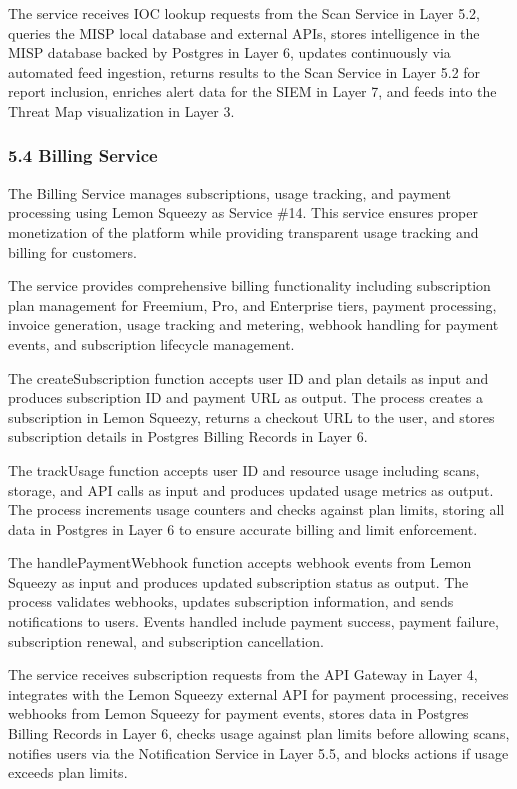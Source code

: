 \documentclass[12pt,a4paper]{report}
\begin{document}
The service receives IOC lookup requests from the Scan Service in Layer 5.2, queries the MISP local database and external APIs, stores intelligence in the MISP database backed by Postgres in Layer 6, updates continuously via automated feed ingestion, returns results to the Scan Service in Layer 5.2 for report inclusion, enriches alert data for the SIEM in Layer 7, and feeds into the Threat Map visualization in Layer 3.

\subsubsection{5.4 Billing Service}

The Billing Service manages subscriptions, usage tracking, and payment processing using Lemon Squeezy as Service \#14. This service ensures proper monetization of the platform while providing transparent usage tracking and billing for customers.

The service provides comprehensive billing functionality including subscription plan management for Freemium, Pro, and Enterprise tiers, payment processing, invoice generation, usage tracking and metering, webhook handling for payment events, and subscription lifecycle management.

The createSubscription function accepts user ID and plan details as input and produces subscription ID and payment URL as output. The process creates a subscription in Lemon Squeezy, returns a checkout URL to the user, and stores subscription details in Postgres Billing Records in Layer 6.

The trackUsage function accepts user ID and resource usage including scans, storage, and API calls as input and produces updated usage metrics as output. The process increments usage counters and checks against plan limits, storing all data in Postgres in Layer 6 to ensure accurate billing and limit enforcement.

The handlePaymentWebhook function accepts webhook events from Lemon Squeezy as input and produces updated subscription status as output. The process validates webhooks, updates subscription information, and sends notifications to users. Events handled include payment success, payment failure, subscription renewal, and subscription cancellation.

The service receives subscription requests from the API Gateway in Layer 4, integrates with the Lemon Squeezy external API for payment processing, receives webhooks from Lemon Squeezy for payment events, stores data in Postgres Billing Records in Layer 6, checks usage against plan limits before allowing scans, notifies users via the Notification Service in Layer 5.5, and blocks actions if usage exceeds plan limits.
\end{document}
